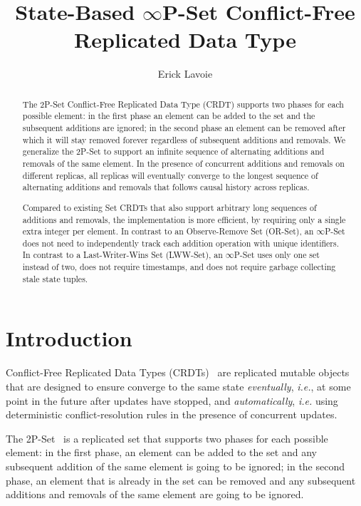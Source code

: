 \documentclass[11pt, oneside]{article}   	%
\title{State-Based $\infty$P-Set Conflict-Free Replicated Data Type}
\author{Erick Lavoie}
\begin{document}
\maketitle


\begin{abstract}
The 2P-Set Conflict-Free Replicated Data Type (CRDT) supports two phases for each possible element: in the first phase an element can be added to the set and the subsequent additions are ignored; in the second phase an element can be removed after which it will stay removed forever regardless of subsequent additions and removals. We generalize the 2P-Set to support an infinite sequence of alternating additions and removals of the same element. In the presence of concurrent additions and removals on different replicas, all replicas will eventually converge to the longest sequence of alternating additions and removals that follows causal history across replicas. 

Compared to existing Set CRDTs that also support arbitrary long sequences of additions and removals, the implementation is more efficient, by requiring only a single extra integer per element. In contrast to an Observe-Remove Set (OR-Set), an $\infty$P-Set does not need to  independently track each addition operation with unique identifiers. In contrast to a Last-Writer-Wins Set (LWW-Set), an $\infty$P-Set uses only one set instead of two, does not require timestamps, and does not require garbage collecting stale state tuples.
\end{abstract}

\section{Introduction}

Conflict-Free Replicated Data Types (CRDTs)~\cite{shapiro:hal-00932836} are replicated mutable objects that are designed to ensure converge to the same state \textit{eventually}, \textit{i.e.}, at some point in the future after updates have stopped, and \textit{automatically}, \textit{i.e.} using deterministic conflict-resolution rules in the presence of concurrent updates. 

The 2P-Set~\cite{shapiro:inria-00555588} is a replicated set that supports two phases for each possible element: in the first phase, an element can be added to the set and any subsequent addition of the same element is going to be ignored; in the second phase, an element that is already in the set can be removed and any subsequent additions and removals of the same element are going to be ignored.
\end{document}
